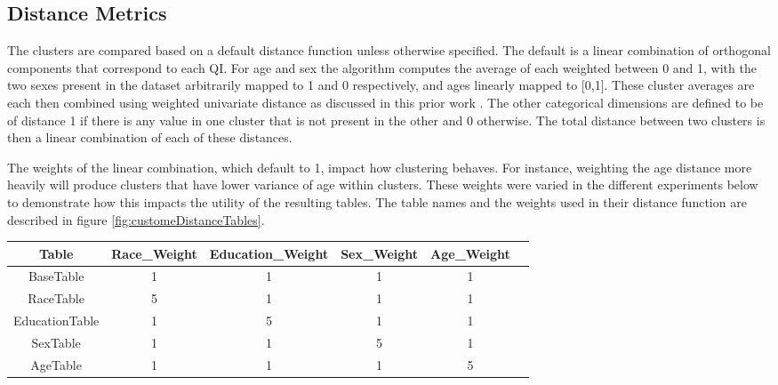 \subsection{Distance Metrics}
The clusters are compared based on a default distance function unless otherwise specified. The default is a linear combination of orthogonal components that correspond to each QI. For age and sex the algorithm computes the average of each weighted between 0 and 1, with the two sexes present in the dataset arbitrarily mapped to 1 and 0 respectively, and ages linearly mapped to [0,1]. These cluster averages are each then combined using weighted univariate distance as discussed in this prior work \cite{domingoPracticalCluster}. The other categorical dimensions are defined to be of distance 1 if there is any value in one cluster that is not present in the other and 0 otherwise. The total distance between two clusters is then a linear combination of each of these distances.

The weights of the linear combination, which default to 1, impact how clustering behaves. For instance, weighting the age distance more heavily will produce clusters that have lower variance of age within clusters. These weights were varied in the different experiments below to demonstrate how this impacts the utility of the resulting tables. The table names and the weights used in their distance function are described in figure \ref{fig:customeDistanceTables}.

\begin{figure*}
\centering
\begin{tabular}{|c||c|c|c|c|c|}
\hline
Table & Race\_Weight & Education\_Weight & Sex\_Weight & Age\_Weight \\
\hline
\hline
BaseTable & 1 & 1 & 1 & 1 \\
\hline
RaceTable & 5 & 1 & 1 & 1  \\
\hline
EducationTable & 1 & 5 & 1 & 1  \\
\hline
SexTable & 1 & 1 & 5 & 1  \\
\hline
AgeTable & 1 & 1 & 1 & 5  \\
\hline
\end{tabular}
\caption{Custom Distance Tables}
\label{fig:customeDistanceTables}
\end{figure*}

